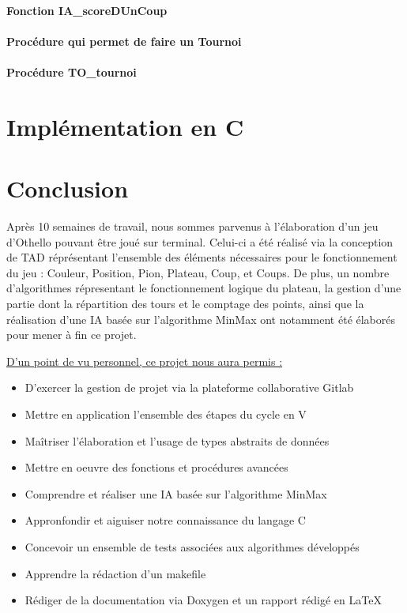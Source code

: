\documentclass{report}
\begin{document}
     \subsubsection{Fonction IA\_scoreDUnCoup}
        \bigskip  
    
       \subsubsection{Procédure qui permet de faire un Tournoi}
     \subsubsection{Procédure TO\_tournoi}
        \bigskip  

      \chapter{Implémentation en C}
       \bigskip  

      \chapter{Conclusion}
    \indent Après 10 semaines de travail, nous sommes parvenus à l'élaboration d'un jeu d'Othello pouvant être joué sur terminal. Celui-ci a été réalisé via la conception de TAD réprésentant l'ensemble des éléments nécessaires pour le fonctionnement du jeu : Couleur, Position, Pion, Plateau, Coup, et Coups. De plus, un nombre d'algorithmes répresentant le fonctionnement logique du plateau, la gestion d'une partie dont la répartition des tours et le comptage des points, ainsi que la réalisation d'une IA basée sur l'algorithme MinMax ont notamment été élaborés pour mener à fin ce projet. 

    \bigskip
    \underline{D'un point de vu personnel, ce projet nous aura permis :}
    \par
    \begin{itemize}
        \item D'exercer la gestion de projet via la plateforme collaborative Gitlab
        \item Mettre en application l'ensemble des étapes du cycle en V
        \item Maîtriser l'élaboration et l'usage de types abstraits de données
        \item Mettre en oeuvre des fonctions et procédures avancées
        \item Comprendre et réaliser une IA basée sur l'algorithme MinMax
        \item Appronfondir et aiguiser notre connaissance du langage C
        \item Concevoir un ensemble de tests associées aux algorithmes développés
        \item Apprendre la rédaction d'un makefile
        \item Rédiger de la documentation via Doxygen et un rapport rédigé en LaTeX
    \end{itemize}
\end{document}
